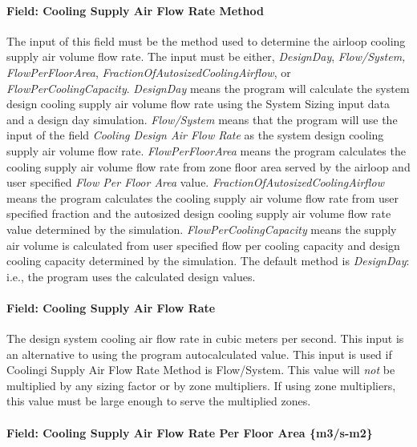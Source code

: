 \paragraph{Field: Cooling Supply Air Flow Rate Method}\label{field-cooling-supply-air-flow-rate-method}

The input of this field must be the method used to determine the airloop cooling supply air volume flow rate. The input must be either, \emph{DesignDay}, \emph{Flow/System,} \emph{FlowPerFloorArea}, \emph{FractionOfAutosizedCoolingAirflow}, or \emph{FlowPerCoolingCapacity}. \emph{DesignDay} means the program will calculate the system design cooling supply air volume flow rate using the System Sizing input data and a design day simulation. \emph{Flow/System} means that the program will use the input of the field \emph{Cooling Design Air Flow Rate} as the system design cooling supply air volume flow rate. \emph{FlowPerFloorArea} means the program calculates the cooling supply air volume flow rate from zone floor area served by the airloop and user specified \emph{Flow Per Floor Area} value. \emph{FractionOfAutosizedCoolingAirflow} means the program calculates the cooling supply air volume flow rate from user specified fraction and the autosized design cooling supply air volume flow rate value determined by the simulation. \emph{FlowPerCoolingCapacity} means the supply air volume is calculated from user specified flow per cooling capacity and design cooling capacity determined by the simulation. The default method is \emph{DesignDay}: i.e., the program uses the calculated design values.

\paragraph{Field: Cooling Supply Air Flow Rate}\label{field-cooling-supply-air-flow-rate}

The design system cooling air flow rate in cubic meters per second. This input is an alternative to using the program autocalculated value. This input is used if Coolingi Supply Air Flow Rate Method is Flow/System. This value will \emph{not} be multiplied by any sizing factor or by zone multipliers. If using zone multipliers, this value must be large enough to serve the multiplied zones.

\paragraph{Field: Cooling Supply Air Flow Rate Per Floor Area \{m3/s-m2\}}\label{field-cooling-supply-air-flow-rate-per-floor-area-m3s-m2}

